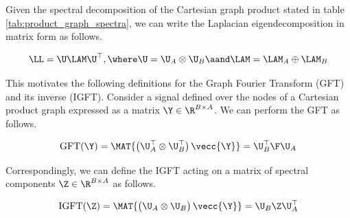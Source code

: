 Given the spectral decomposition of the Cartesian graph product stated in table \ref{tab:product_graph_spectra}, we can write the Laplacian eigendecomposition in matrix form as follows. 

\begin{equation}
    \LL = \U \LAM \U^\top, \where \U = \U_A \otimes \U_B \aand \LAM = \LAM_A \oplus \LAM_B
\end{equation}

This motivates the following definitions for the Graph Fourier Transform (GFT) and its inverse (IGFT). Consider a signal defined over the nodes of a Cartesian product graph expressed as a matrix $\Y \in \R^{B \times A}$. We can perform the GFT as follows. 

\begin{equation}
    \text{GFT}(\Y) = \MAT{\big( \U_A^\top \otimes \U_B^\top \big) \, \vecc{\Y}} = \U_B^\top \F \U_A
\end{equation}

Correspondingly, we can define the IGFT acting on a matrix of spectral components $\Z \in \R^{B \times A}$ as follows. 

\begin{equation}
    \text{IGFT}(\Z) = \MAT{\big( \U_A \otimes \U_B \big)\,\vecc{\Y}} = \U_B \Z \U_A^\top
\end{equation}


